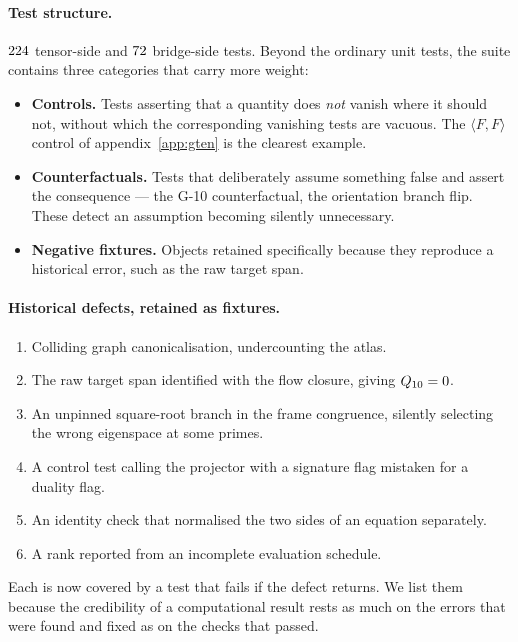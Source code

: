 \paragraph{Test structure.}
$224$ tensor-side and $72$ bridge-side tests. Beyond the
ordinary unit tests, the suite contains three categories that carry more weight:
\begin{itemize}\itemsep2pt
\item \textbf{Controls.} Tests asserting that a quantity does \emph{not} vanish
      where it should not, without which the corresponding vanishing tests are
      vacuous. The $\langle F,F\rangle$ control of appendix~\ref{app:gten} is the
      clearest example.
\item \textbf{Counterfactuals.} Tests that deliberately assume something false
      and assert the consequence --- the G-10 counterfactual, the orientation
      branch flip. These detect an assumption becoming silently unnecessary.
\item \textbf{Negative fixtures.} Objects retained specifically because they
      reproduce a historical error, such as the raw target span.
\end{itemize}

\paragraph{Historical defects, retained as fixtures.}
\begin{enumerate}\itemsep2pt
\item Colliding graph canonicalisation, undercounting the atlas.
\item The raw target span identified with the flow closure, giving
      $Q_{10} = 0$.
\item An unpinned square-root branch in the frame congruence, silently selecting
      the wrong eigenspace at some primes.
\item A control test calling the projector with a signature flag mistaken for a
      duality flag.
\item An identity check that normalised the two sides of an equation separately.
\item A rank reported from an incomplete evaluation schedule.
\end{enumerate}
Each is now covered by a test that fails if the defect returns. We list them
because the credibility of a computational result rests as much on the errors
that were found and fixed as on the checks that passed.
